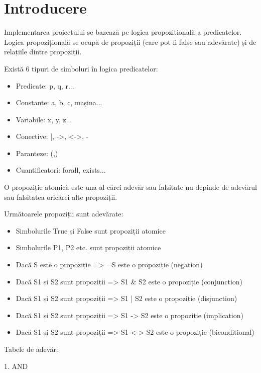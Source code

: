  \section{Introducere}

 Implementarea proiectului se bazează pe logica propozitională a predicatelor. Logica propozițională se ocupă de propoziții (care pot fi false sau adevărate) și de relațiile dintre propoziții.
 
 Există 6 tipuri de simboluri în logica predicatelor:
 \begin{itemize}
    \setlength\itemsep{0em}
    \item Predicate: p, q, r...
    \item Constante: a, b, c, mașina...
    \item Variabile: x, y, z...
    \item Conective: |, ->, <->, -
    \item Paranteze: (,)
    \item Cuantificatori: forall, exists...
\end{itemize}


O propoziție atomică este una al cărei adevăr sau falsitate nu depinde de adevărul sau falsitatea oricărei alte propoziții.

   Următoarele propoziții sunt adevărate:
 \begin{itemize}
    \setlength\itemsep{0em}
    \item Simbolurile True și False  sunt propoziții atomice
    
    \item  Simbolurile P1, P2 etc. sunt propoziții atomice
    \item Dacă S este o propoziție => ¬S este o propoziție (negation)
    \item  Dacă S1 și S2 sunt propoziții => S1 &  S2  este o propoziție (conjunction)
    
    \item Dacă S1 și S2 sunt propoziții => S1 | S2 este o propoziție (disjunction)
    \item Dacă S1 și S2 sunt propoziții => S1 -> S2 este o propoziție (implication)
    \item Dacă S1 și S2 sunt propoziții => S1 <-> S2 este o propoziție (biconditional)
\end{itemize}

Tabele de adevăr:

1. AND                      
\\

